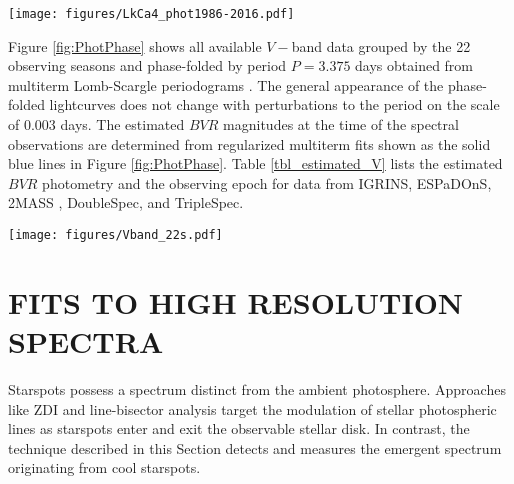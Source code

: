 \documentclass[twocolumn]{emulateapj}%
\newcommand{\name}{LkCa 4 }
\begin{document}
\begin{figure*}
 \centering
 \texttt{[image: figures/LkCa4\_phot1986-2016.pdf]}
 \caption{Overview of \name $V-$band photometric monitoring from 1986$-$2016.  The vertical lines denote the observing epochs of 2MASS, IGRINS, ESPaDOnS, DoubleSpec, and TripleSpec.  The near contemporaneous DoubleSpec and TripleSpec epochs lay on top of each other on this scale, as do the 12 ESPaDOnS epochs.  The abscissa range is equal to the current lifespan of the first author of this paper.}
 \label{fig:PhotTime}
\end{figure*}

Figure \ref{fig:PhotPhase} shows all available $V-$band data grouped by the 22 observing seasons and phase-folded by period $P=3.375$ days obtained from multiterm Lomb-Scargle periodograms \citep{ivezic14}.  The general appearance of the phase-folded lightcurves does not change with perturbations to the period on the scale of 0.003 days.  The estimated $BVR$ magnitudes at the time of the spectral observations are determined from regularized multiterm fits \citep{vanderplas15a} shown as the solid blue lines in Figure \ref{fig:PhotPhase}.  Table \ref{tbl_estimated_V} lists the estimated $BVR$ photometry and the observing epoch for data from IGRINS, ESPaDOnS, 2MASS \citep{skrutskie06}, DoubleSpec, and TripleSpec.  

\begin{figure*}
 \centering
 \texttt{[image: figures/Vband\_22s.pdf]}
 \caption{Phase-folded lightcurves constructed assuming the same period for all observing seasons.  The blue solid lines show a multi-term regularized periodic fit keeping the first $M_{\rm max}=4$ Fourier components.  The vertical lines show the epochs of observations for ancillary data, with the same line styles and colors as Figure \ref{fig:PhotTime}.  The unchanged vertical and horizontal scales highlight the secular drift of the light curve amplitude and morphology.}
 \label{fig:PhotPhase}
\end{figure*}





\section{FITS TO HIGH RESOLUTION SPECTRA}\label{sec:Starfish}

Starspots possess a spectrum distinct from the ambient photosphere.  Approaches like ZDI and line-bisector analysis  target the modulation of stellar photospheric lines as starspots enter and exit the observable stellar disk.  In contrast, the technique described in this Section detects and measures the emergent spectrum originating from cool starspots.
\end{document}
